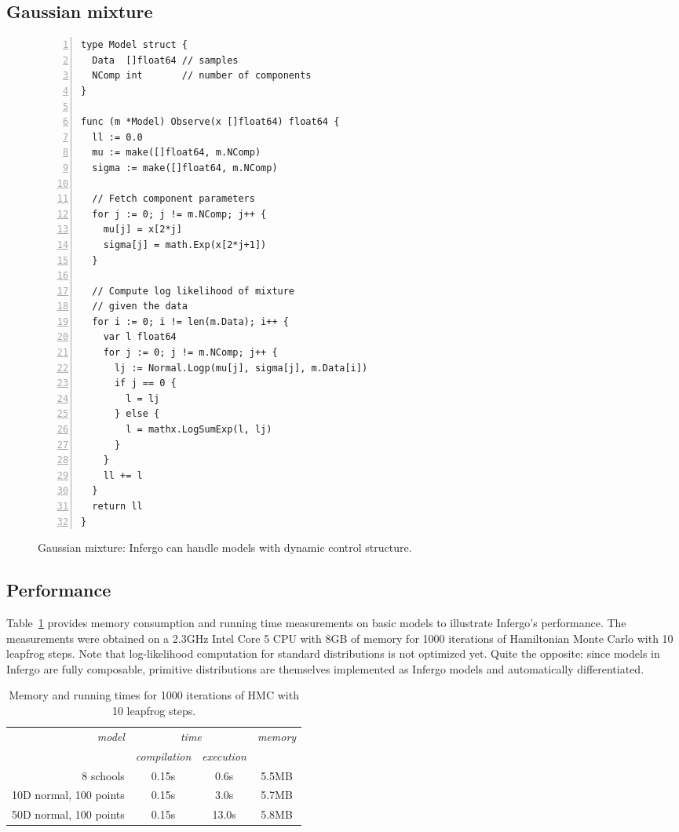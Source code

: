 \documentclass[sigplan,review,10pt,anonymous]{acmart}
\begin{document}
\begin{sloppypar}
\subsection{Gaussian mixture}

\begin{figure}
\begin{lstlisting}[numbers=left]
type Model struct {
  Data  []float64 // samples
  NComp int       // number of components
}

func (m *Model) Observe(x []float64) float64 {
  ll := 0.0
  mu := make([]float64, m.NComp)
  sigma := make([]float64, m.NComp)

  // Fetch component parameters
  for j := 0; j != m.NComp; j++ {
    mu[j] = x[2*j]
    sigma[j] = math.Exp(x[2*j+1])
  }

  // Compute log likelihood of mixture
  // given the data
  for i := 0; i != len(m.Data); i++ {
    var l float64
    for j := 0; j != m.NComp; j++ {
      lj := Normal.Logp(mu[j], sigma[j], m.Data[i])
      if j == 0 {
        l = lj
      } else {
        l = mathx.LogSumExp(l, lj)
      }
    }
    ll += l
  }
  return ll
}
\end{lstlisting}
\caption{Gaussian mixture: Infergo can handle models with
	dynamic control structure.}
\label{fig:linear-regression}
\end{figure}


\subsection{Performance}

Table~\ref{tab:memory-runtime} provides memory consumption and
running time measurements on basic models to illustrate
Infergo's performance.  The measurements were obtained on a
2.3GHz Intel Core 5 CPU with 8GB of memory for 1000 iterations
of Hamiltonian Monte Carlo with 10 leapfrog steps. Note that
log-likelihood computation for standard distributions is not
optimized yet. Quite the opposite: since models in Infergo are
fully composable, primitive distributions are themselves
implemented as Infergo models and automatically differentiated.

{\smaller
\begin{table}[H]
\caption{Memory and running times for 1000 iterations
of HMC with 10 leapfrog steps.}
\label{tab:memory-runtime}
\begin{tabular}{r | c |  c | c}
	{\it model}  & \multicolumn{2}{c|}{\it time} & {\it memory} \\ 
	 & {\it compilation} & {\it execution} & \\\hline
	8 schools & 0.15s & 0.6s & 5.5MB \\
	10D normal, 100 points & 0.15s & 3.0s & 5.7MB \\
	50D normal, 100 points & 0.15s & 13.0s & 5.8MB 
\end{tabular}
\end{table}}


\end{sloppypar}
\end{document}
